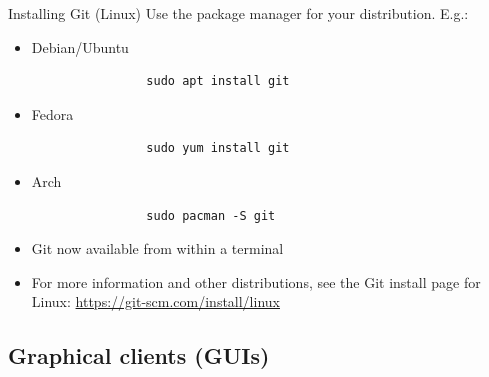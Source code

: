 \begin{frame}[fragile]{Installing Git (Linux)}\label{installing_git_linux}
    Use the package manager for your distribution.  E.g.:
    \begin{itemize}
        \item Debian/Ubuntu
            \begin{verbatim}
                sudo apt install git
            \end{verbatim}
        \item Fedora
            \begin{verbatim}
                sudo yum install git
            \end{verbatim}
        \item Arch
            \begin{verbatim}
                sudo pacman -S git
            \end{verbatim}
        \item Git now available from within a terminal
        \item For more information and other distributions, see the Git
            install page for Linux:
            {\footnotesize \url{https://git-scm.com/install/linux}}
    \end{itemize}
\end{frame}

\subsection{Graphical clients (GUIs)}

